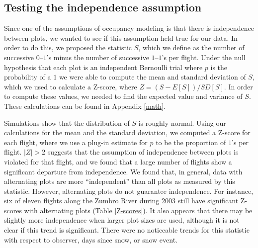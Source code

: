 \documentclass[12pt]{article}
\begin{document}
    \subsection{Testing the independence assumption}
    \label{shat}
    Since one of the assumptions of occupancy modeling is that there is
    independence between plots, we wanted to see if this assumption held true
    for our data.  In order to do this, we proposed the statistic \(S\), which
    we define as the number of successive \(0\)--\(1\)'s minus the number of
    successive \(1\)--\(1\)'s per flight. Under the null hypothesis that each
    plot is an independent Bernoulli trial where \(p\) is the probability of a
    \(1\) we were able
    to compute the mean and standard deviation of \(S\), which we used to
    calculate a Z-score, where \(Z = (S - E[S])/SD[S]\). In order to
    compute these values, we needed to find the
    expected value and variance of \(S\). These calculations can be
    found in Appendix \ref{math}.

    Simulations show that the distribution of \(S\) is roughly normal.
    Using our calculations for the mean and the standard deviation, we
    computed a Z-score for each flight, where we use a plug-in estimate for
    \(p\) to be the proportion of \(1\)'s per flight. \(|Z| > 2\) suggests that
    the assumption of
    independence between plots is violated for that flight, and we found that a
    large number of flights show a significant departure from independence. We
    found that, in
    general, data with alternating plots are more ``independent'' than all plots
    as measured
    by this statistic. However, alternating plots do not guarantee independence.
    For instance, six of eleven flights along the Zumbro River during 2003 still
    have significant Z-scores with alternating plots (Table \ref{Z-scores}). It
    also appears that there
    may be slightly more independence when larger plot sizes are used, although
    it is not clear if this trend is significant. There
    were no noticeable trends for this statistic with respect to observer, days
    since snow, or snow event.
\end{document}
